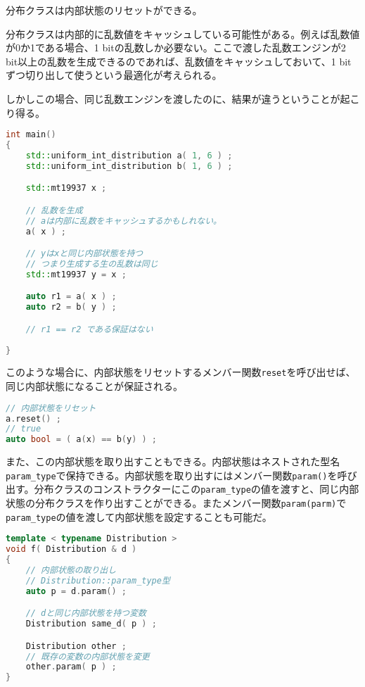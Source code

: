 分布クラスは内部状態のリセットができる。

分布クラスは内部的に乱数値をキャッシュしている可能性がある。例えば乱数値が0か1である場合、1 bitの乱数しか必要ない。ここで渡した乱数エンジンが2 bit以上の乱数を生成できるのであれば、乱数値をキャッシュしておいて、1 bitずつ切り出して使うという最適化が考えられる。

しかしこの場合、同じ乱数エンジンを渡したのに、結果が違うということが起こり得る。

\begin{lstlisting}[language={C++}]
int main()
{
    std::uniform_int_distribution a( 1, 6 ) ;
    std::uniform_int_distribution b( 1, 6 ) ;

    std::mt19937 x ;

    // 乱数を生成
    // aは内部に乱数をキャッシュするかもしれない。
    a( x ) ;

    // yはxと同じ内部状態を持つ
    // つまり生成する生の乱数は同じ
    std::mt19937 y = x ;

    auto r1 = a( x ) ;
    auto r2 = b( y ) ;

    // r1 == r2 である保証はない
    
}
\end{lstlisting}

このような場合に、内部状態をリセットするメンバー関数\texttt{reset}を呼び出せば、同じ内部状態になることが保証される。

\begin{lstlisting}[language={C++}]
// 内部状態をリセット
a.reset() ;
// true
auto bool = ( a(x) == b(y) ) ;
\end{lstlisting}

また、この内部状態を取り出すこともできる。内部状態はネストされた型名\texttt{param\_type}で保持できる。内部状態を取り出すにはメンバー関数\texttt{param()}を呼び出す。分布クラスのコンストラクターにこの\texttt{param\_type}の値を渡すと、同じ内部状態の分布クラスを作り出すことができる。またメンバー関数\texttt{param(parm)}で\texttt{param\_type}の値を渡して内部状態を設定することも可能だ。

\begin{lstlisting}[language={C++}]
template < typename Distribution >
void f( Distribution & d )
{
    // 内部状態の取り出し
    // Distribution::param_type型
    auto p = d.param() ;

    // dと同じ内部状態を持つ変数
    Distribution same_d( p ) ;

    Distribution other ;
    // 既存の変数の内部状態を変更
    other.param( p ) ;
} 
\end{lstlisting}

